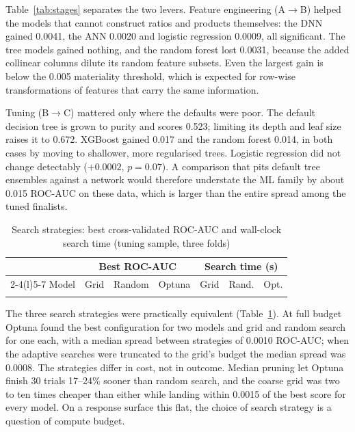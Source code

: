 \documentclass[conference]{IEEEtran}
\begin{document}
Table~\ref{tab:stages} separates the two levers. Feature engineering (A$\rightarrow$B) helped the models that cannot construct ratios and products themselves: the DNN gained 0.0041, the ANN 0.0020 and logistic regression 0.0009, all significant. The tree models gained nothing, and the random forest lost 0.0031, because the added collinear columns dilute its random feature subsets. Even the largest gain is below the 0.005 materiality threshold, which is expected for row-wise transformations of features that carry the same information.

Tuning (B$\rightarrow$C) mattered only where the defaults were poor. The default decision tree is grown to purity and scores 0.523; limiting its depth and leaf size raises it to 0.672. XGBoost gained 0.017 and the random forest 0.014, in both cases by moving to shallower, more regularised trees. Logistic regression did not change detectably ($+0.0002$, $p=0.07$). A comparison that pits default tree ensembles against a network would therefore understate the ML family by about 0.015 ROC-AUC on these data, which is larger than the entire spread among the tuned finalists.

\begin{table}[t]
\caption{Search strategies: best cross-validated ROC-AUC and wall-clock search time (tuning sample, three folds)}
\label{tab:hpo}
\centering
\footnotesize
\begin{tabular}{@{}lcccrrr@{}}
\toprule
 & \multicolumn{3}{c}{Best ROC-AUC} & \multicolumn{3}{c}{Search time (s)} \\
\cmidrule(lr){2-4}\cmidrule(l){5-7}
Model & Grid & Random & Optuna & Grid & Rand. & Opt. \\
\midrule
\\
\bottomrule
\end{tabular}
\end{table}

The three search strategies were practically equivalent (Table~\ref{tab:hpo}). At full budget Optuna found the best configuration for two models and grid and random search for one each, with a median spread between strategies of 0.0010 ROC-AUC; when the adaptive searches were truncated to the grid's budget the median spread was 0.0008. The strategies differ in cost, not in outcome. Median pruning let Optuna finish 30 trials 17--24\% sooner than random search, and the coarse grid was two to ten times cheaper than either while landing within 0.0015 of the best score for every model. On a response surface this flat, the choice of search strategy is a question of compute budget.
\end{document}
